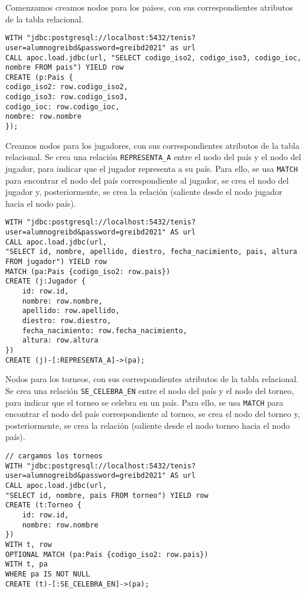 Comenzamos creamos nodos para los paises, con sus correspondientes atributos de la tabla relacional. 

\begin{lstlisting}[language=Cypher]
WITH "jdbc:postgresql://localhost:5432/tenis?user=alumnogreibd&password=greibd2021" as url
CALL apoc.load.jdbc(url, "SELECT codigo_iso2, codigo_iso3, codigo_ioc, nombre FROM pais") YIELD row
CREATE (p:Pais {
codigo_iso2: row.codigo_iso2,
codigo_iso3: row.codigo_iso3,
codigo_ioc: row.codigo_ioc,
nombre: row.nombre
});
\end{lstlisting}


Creamos nodos para los jugadores, con sus correspondientes atributos de la tabla relacional. Se crea una relación \texttt{REPRESENTA\_A} entre el nodo del país y el nodo del jugador, para indicar que el jugador representa a su país. Para ello, se usa \texttt{MATCH} para encontrar el nodo del país correspondiente al jugador, se crea el nodo del jugador y, posteriormente, se crea la relación (saliente desde el nodo jugador hacia el nodo país).

\begin{lstlisting}[language=Cypher]
WITH "jdbc:postgresql://localhost:5432/tenis?user=alumnogreibd&password=greibd2021" AS url
CALL apoc.load.jdbc(url, 
"SELECT id, nombre, apellido, diestro, fecha_nacimiento, pais, altura FROM jugador") YIELD row
MATCH (pa:Pais {codigo_iso2: row.pais})
CREATE (j:Jugador {
    id: row.id,
    nombre: row.nombre,
    apellido: row.apellido,
    diestro: row.diestro,
    fecha_nacimiento: row.fecha_nacimiento,
    altura: row.altura
})
CREATE (j)-[:REPRESENTA_A]->(pa);
\end{lstlisting}

Nodos para los torneos, con sus correspondientes atributos de la tabla relacional. Se crea una relación \texttt{SE\_CELEBRA\_EN} entre el nodo del país y el nodo del torneo, para indicar que el torneo se celebra en un país. Para ello, se usa \texttt{MATCH} para encontrar el nodo del país correspondiente al torneo, se crea el nodo del torneo y, posteriormente, se crea la relación (saliente desde el nodo torneo hacia el nodo país).

\begin{lstlisting}[language=Cypher]
// cargamos los torneos
WITH "jdbc:postgresql://localhost:5432/tenis?user=alumnogreibd&password=greibd2021" AS url
CALL apoc.load.jdbc(url,
"SELECT id, nombre, pais FROM torneo") YIELD row
CREATE (t:Torneo {
    id: row.id,
    nombre: row.nombre
})
WITH t, row
OPTIONAL MATCH (pa:Pais {codigo_iso2: row.pais})
WITH t, pa
WHERE pa IS NOT NULL
CREATE (t)-[:SE_CELEBRA_EN]->(pa);
\end{lstlisting}

